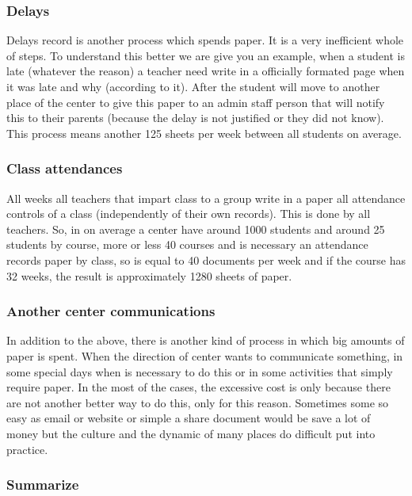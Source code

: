 \subsubsection{Delays}

Delays record is another process which spends paper. It is a very inefficient
whole of steps. To understand this better we are give you an example, when a
student is late (whatever the reason) a teacher need write in a officially formated
page when it was late and why (according to it).
\intro
After the student will move to another place of the center to give this paper
to an admin staff person that will
notify this to their parents (because the delay is not justified or they did not
know). This process means another 125 sheets per week between all students on average.

\subsubsection{Class attendances}

All weeks all teachers that impart class to a group write in a paper
all attendance controls of a class (independently of their own records). This
is done by all teachers. So, in on average a center have around 1000 students
and around 25 students by course, more or less 40 courses and is necessary
an attendance records paper by class, so is equal to 40 documents per week and
if the course has 32 weeks, the result is approximately 1280 sheets of paper.

\subsubsection{Another center communications}

In addition to the above, there is another kind of process in which big amounts
of paper is spent. When the direction of center wants to communicate something,
in some special days when is necessary to do this or in some activities that
simply require paper.
In the most of the cases, the excessive cost is only because there are not another better way
to do this, only for this reason. Sometimes some so easy as email or website or
simple a share document would be save a lot of money but the culture and the
dynamic of many places do difficult put into practice.


\subsubsection{Summarize}

